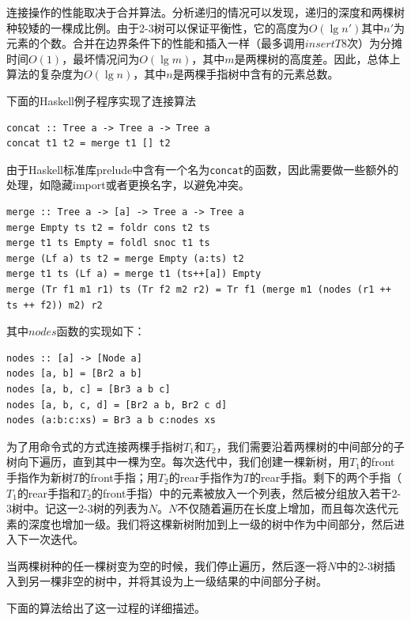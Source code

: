 \documentclass[b5paper]{ctexart}
\begin{document}
连接操作的性能取决于合并算法。分析递归的情况可以发现，递归的深度和两棵树种较矮的一棵成比例。由于2-3树可以保证平衡性，它的高度为$O(\lg n')$其中$n'$为元素的个数。合并在边界条件下的性能和插入一样（最多调用$insertT$8次）为分摊时间$O(1)$，最坏情况问为$O(\lg m)$，其中$m$是两棵树的高度差。因此，总体上算法的复杂度为$O(\lg n)$，其中$n$是两棵手指树中含有的元素总数。

下面的Haskell例子程序实现了连接算法

\lstset{language=Haskell}
\begin{lstlisting}[style=Haskell]
concat :: Tree a -> Tree a -> Tree a
concat t1 t2 = merge t1 [] t2
\end{lstlisting}

由于Haskell标准库prelude中含有一个名为\texttt{concat}的函数，因此需要做一些额外的处理，如隐藏import或者更换名字，以避免冲突。

\begin{lstlisting}[style=Haskell]
merge :: Tree a -> [a] -> Tree a -> Tree a
merge Empty ts t2 = foldr cons t2 ts
merge t1 ts Empty = foldl snoc t1 ts
merge (Lf a) ts t2 = merge Empty (a:ts) t2
merge t1 ts (Lf a) = merge t1 (ts++[a]) Empty
merge (Tr f1 m1 r1) ts (Tr f2 m2 r2) = Tr f1 (merge m1 (nodes (r1 ++ ts ++ f2)) m2) r2
\end{lstlisting}

其中$nodes$函数的实现如下：

\begin{lstlisting}[style=Haskell]
nodes :: [a] -> [Node a]
nodes [a, b] = [Br2 a b]
nodes [a, b, c] = [Br3 a b c]
nodes [a, b, c, d] = [Br2 a b, Br2 c d]
nodes (a:b:c:xs) = Br3 a b c:nodes xs
\end{lstlisting}

为了用命令式的方式连接两棵手指树$T_1$和$T_2$，我们需要沿着两棵树的中间部分的子树向下遍历，直到其中一棵为空。每次迭代中，我们创建一棵新树，用$T_1$的front手指作为新树$T$的front手指；用$T_2$的rear手指作为$T$的rear手指。剩下的两个手指（$T_1$的rear手指和$T_2$的front手指）中的元素被放入一个列表，然后被分组放入若干2-3树中。记这一2-3树的列表为$N$。$N$不仅随着遍历在长度上增加，而且每次迭代元素的深度也增加一级。我们将这棵新树附加到上一级的树中作为中间部分，然后进入下一次迭代。

当两棵树种的任一棵树变为空的时候，我们停止遍历，然后逐一将$N$中的2-3树插入到另一棵非空的树中，并将其设为上一级结果的中间部分子树。

下面的算法给出了这一过程的详细描述。
\end{document}
